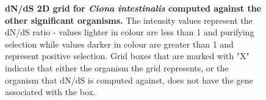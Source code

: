 \documentclass{article}
\begin{document}
\begin{figure}[H]
\centering
{}
\caption{\textbf{dN/dS 2D grid for \textit{Ciona intestinalis} computed against the other significant organisms.} The intensity values represent the dN/dS ratio - values lighter in colour are less than 1 and purifying selection while values darker in colour are greater than 1 and represent positive selection. Grid boxes that are marked with "X" indicate that either the organism the grid represents, or the organism that dN/dS is computed against, does not have the gene associated with the box.}
\label{sup_fig_21}
\end{figure}
\end{document}
